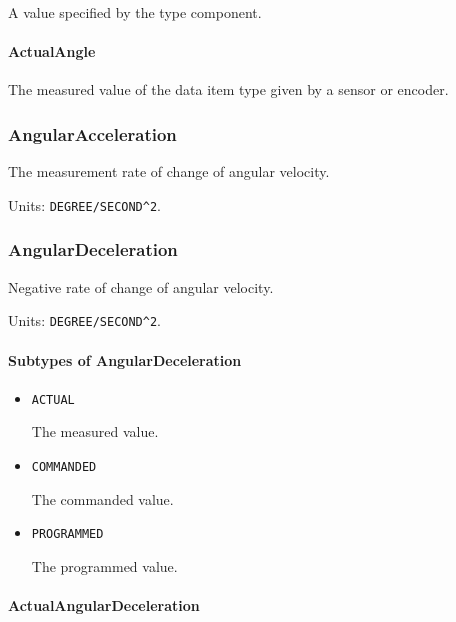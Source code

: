 A value specified by the  type component.


\paragraph{ActualAngle}\mbox{}
\label{sec:ActualAngle}


The measured value of the data item type given by a sensor or encoder.


\subsubsection{AngularAcceleration}
\label{sec:AngularAcceleration}



The measurement rate of change of angular velocity.


Units: \texttt{DEGREE/SECOND\^{}2}.

\subsubsection{AngularDeceleration}
\label{sec:AngularDeceleration}



Negative rate of change of angular velocity.


Units: \texttt{DEGREE/SECOND\^{}2}.

\paragraph{Subtypes of AngularDeceleration}\mbox{}
\label{sec:Subtypes of AngularDeceleration}

\begin{itemize}

\item \texttt{ACTUAL}


The measured value.

\item \texttt{COMMANDED}


The commanded value.

\item \texttt{PROGRAMMED}


The programmed value.


\end{itemize}

\paragraph{ActualAngularDeceleration}\mbox{}
\label{sec:ActualAngularDeceleration}


